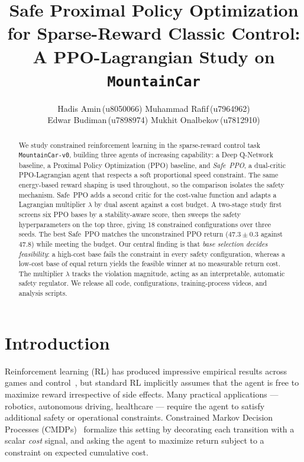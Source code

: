 \documentclass{article}
\title{Safe Proximal Policy Optimization for Sparse-Reward Classic Control: \\
A PPO-Lagrangian Study on \texttt{MountainCar}}
\author{Hadis Amin\,(u8050066) \quad Muhammad Rafif\,(u7964962) \\[2pt]
Edwar Budiman\,(u7898974) \quad Mukhit Onalbekov\,(u7812910)}
\date{}
\begin{document}
\maketitle

\begin{abstract}
We study constrained reinforcement learning in the sparse-reward control task
\texttt{MountainCar-v0}, building three agents of increasing capability: a Deep Q-Network baseline,
a Proximal Policy Optimization (PPO) baseline, and \emph{Safe~PPO}, a dual-critic PPO-Lagrangian
agent that respects a soft proportional speed constraint. The same energy-based reward shaping is
used throughout, so the comparison isolates the safety mechanism. Safe~PPO adds a second critic for
the cost-value function and adapts a Lagrangian multiplier $\lambda$ by dual ascent against a cost
budget. A two-stage study first screens six PPO bases by a stability-aware score, then sweeps the
safety hyperparameters on the top three, giving 18 constrained configurations over three seeds.
The best Safe~PPO matches the unconstrained PPO return ($47.3 \pm 0.3$ against $47.8$) while meeting
the budget. Our central finding is that \emph{base selection decides feasibility}: a high-cost base
fails the constraint in every safety configuration, whereas a low-cost base of equal return yields
the feasible winner at no measurable return cost. The multiplier $\lambda$ tracks the violation
magnitude, acting as an interpretable, automatic safety regulator. We release all code,
configurations, training-process videos, and analysis scripts.
\end{abstract}


\section{Introduction}
\label{sec:intro}

Reinforcement learning (RL) has produced impressive empirical results across games and control~\citep{mnih2015dqn,schulman2017ppo}, but standard RL implicitly assumes that the agent is free to
maximize reward irrespective of side effects. Many practical applications --- robotics, autonomous
driving, healthcare --- require the agent to satisfy additional safety or operational
constraints. Constrained Markov Decision Processes (CMDPs)~\citep{altman1999cmdp} formalize this
setting by decorating each transition with a scalar \emph{cost} signal, and asking the agent to
maximize return subject to a constraint on expected cumulative cost.
\end{document}
